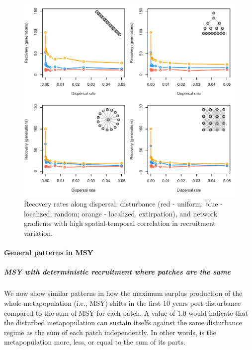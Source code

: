 \documentclass[]{article}
\let\oldparagraph\paragraph
\renewcommand{\paragraph}[1]{\oldparagraph{#1}\mbox{}}
\let\oldsubparagraph\subparagraph
\renewcommand{\subparagraph}[1]{\oldsubparagraph{#1}\mbox{}}
\begin{document}
\begin{figure}[H]

{\centering \includegraphics{Managing_for_ecological_surprises_in_metapopulations_makeHTML_files/figure-latex/spatiotemporal correlation-1} 

}

\caption{Recovery rates along dispersal, disturbance (red - uniform; blue - localized, random; orange - localized, extirpation), and network gradients with high spatial-temporal correlation in recruitment variation.}\label{fig:spatiotemporal correlation}
\end{figure}
\newpage

\hypertarget{general-patterns-in-msy}{%
\paragraph{General patterns in MSY}\label{general-patterns-in-msy}}

\hypertarget{msy-with-deterministic-recruitment-where-patches-are-the-same}{%
\subparagraph{MSY with deterministic recruitment where patches are the
same}\label{msy-with-deterministic-recruitment-where-patches-are-the-same}}

We now show similar patterns in how the maximum surplus production of
the whole metapopulation (i.e., MSY) shifts in the first 10 years
post-disturbance compared to the sum of MSY for each patch. A value of
1.0 would indicate that the disturbed metapopulation can sustain itselfs
against the same disturbance regime as the sum of each patch
independently. In other words, is the metapopulation more, less, or
equal to the sum of its parts.
\end{document}
